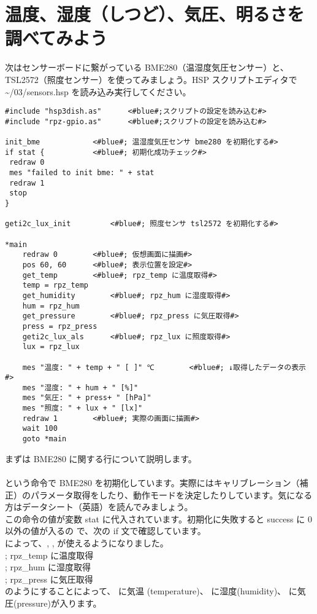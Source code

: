 \section{温度、湿度（しつど）、気圧、明るさを調べてみよう}\label{sec:sensors}
次はセンサーボードに繋がっている BME280（温湿度気圧センサー）と、TSL2572（照度センサー）を使ってみましょう。HSP スクリプトエディタで\textasciitilde /03/sensors.hsp を読み込み実行してください。\\

\begin{lstlisting}[caption=sensors.hsp,label=sensors.hsp]
#include "hsp3dish.as"		<#blue#;スクリプトの設定を読み込む#>
#include "rpz-gpio.as"		<#blue#;スクリプトの設定を読み込む#>

init_bme			<#blue#; 温湿度気圧センサ bme280 を初期化する#>
if stat { 			<#blue#; 初期化成功チェック#>
 redraw 0
 mes "failed to init bme: " + stat
 redraw 1
 stop
}

geti2c_lux_init 		<#blue#; 照度センサ tsl2572 を初期化する#>

*main
	redraw 0 		<#blue#; 仮想画面に描画#>
	pos 60, 60 		<#blue#; 表示位置を設定#>
	get_temp		<#blue#; rpz_temp に温度取得#>
	temp = rpz_temp
	get_humidity		<#blue#; rpz_hum に湿度取得#>
	hum = rpz_hum
	get_pressure		<#blue#; rpz_press に気圧取得#>
	press = rpz_press
	geti2c_lux_als		<#blue#; rpz_lux に照度取得#>
	lux = rpz_lux

	mes "温度: " + temp + " [ ]" ℃		<#blue#; ↓取得したデータの表示#>
	mes "湿度: " + hum + " [%]"
	mes "気圧: " + press+ " [hPa]"
	mes "照度: " + lux + " [lx]"
	redraw 1		<#blue#; 実際の画面に描画#>
	wait 100
	goto *main
\end{lstlisting}

まずは BME280 に関する行について説明します。\\
\\
という命令で BME280 を初期化しています。実際にはキャリブレーション（補正）のパラメータ取得をしたり、動作モードを決定したりしています。気になる方はデータシート（英語）を読んでみましょう。\\
この命令の値が変数 stat に代入されています。初期化に失敗すると success に 0 以外の値が入るの
で、次の if 文で確認しています。\\
 によって、, ,  が使えるようになりました。\\
	; rpz\_temp に温度取得\\
	; rpz\_hum に湿度取得\\
	; rpz\_press に気圧取得\\
のようにすることによって、 に気温 (temperature)、  に湿度(humidity)、 に気圧(pressure)が入ります。

